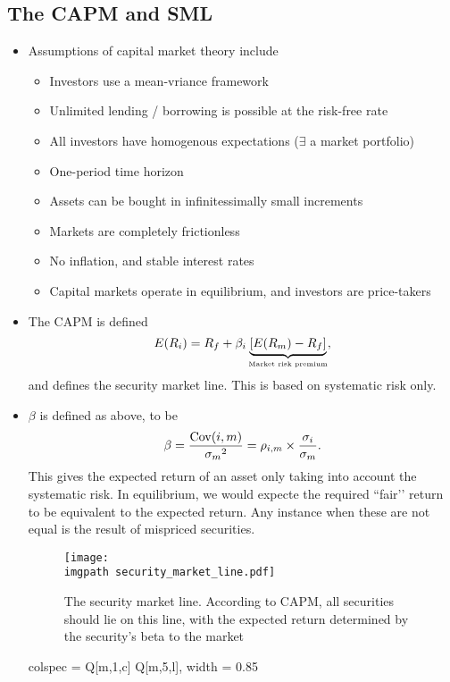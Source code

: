 \documentclass[../notes_compiled.tex]{subfiles}
\begin{document}
\subsection{The CAPM and SML}
\begin{itemize}
\item Assumptions of capital market theory include
\begin{itemize}
\item Investors use a mean-vriance framework
\item Unlimited lending / borrowing is possible at the risk-free rate
\item All investors have homogenous expectations ($\exists$ a market portfolio)
\item One-period time horizon
\item Assets can be bought in infinitessimally small increments
\item Markets are completely frictionless
\item No inflation, and stable interest rates
\item Capital markets operate in equilibrium, and investors are price-takers
\end{itemize}
\item The CAPM is defined
\begin{equation}
E(R_{i}) = R_{f} + \beta_{i}\underbrace{[E(R_{m}) - R_{f}]}_{\text{\tiny{Market risk premium}}},
\end{equation}
and defines the security market line. This is based on systematic risk only.
\item $\beta$ is defined as above, to be
\begin{equation}
\beta=\frac{\operatorname{Cov}(i,m)}{{\sigma_{m}}^{2}} = \rho_{i,m}\times\frac{\sigma_{i}}{\sigma_{m}}.
\end{equation}
This gives the expected return of an asset only taking into account the systematic risk. In equilibrium, we would expecte the required ``fair’’ return to be equivalent to the expected return. Any instance when these are not equal is the result of mispriced securities.
\begin{figure}[h]
  \centering
  \texttt{[image: \\imgpath security\_market\_line.pdf]}
  \caption{The security market line. According to CAPM, all securities should lie on this line, with the expected return determined by the security’s beta to the market}
\end{figure}
\begin{table}[h!]
\centering
\begin{tblr}{colspec = {Q[m,1,c] Q[m,5,l]}, width = 0.85\textwidth}

\end{tblr}
\end{table}
\end{itemize}
\end{document}
